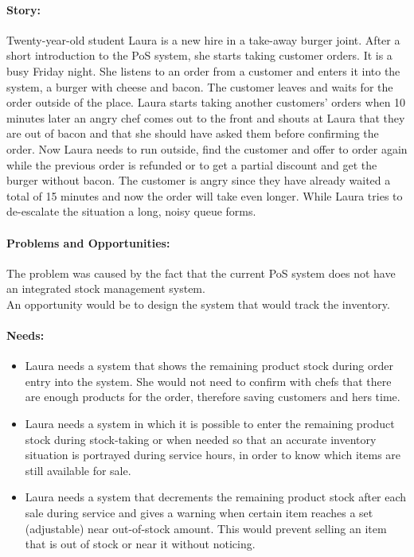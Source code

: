 \documentclass{article}
\begin{document}
\paragraph{\small Story:} Twenty-year-old student Laura is a new hire in a take-away burger joint. After a short introduction to the PoS system, she starts taking customer orders. It is a busy Friday night. She listens to an order from a customer and enters it into the system, a burger with cheese and bacon. The customer leaves and waits for the order outside of the place. Laura starts taking another customers' orders when 10 minutes later an angry chef comes out to the front and shouts at Laura that they are out of bacon and that she should have asked them before confirming the order. Now Laura needs to run outside, find the customer and offer to order again while the previous order is refunded or to get a partial discount and get the burger without bacon. The customer is angry since they have already waited a total of 15 minutes and now the order will take even longer. While Laura tries to de-escalate the situation a long, noisy queue forms.
\paragraph{\small Problems and Opportunities:} The problem was caused by the fact that the current PoS system does not have an integrated stock management system.\\ An opportunity would be to design the system that would track the inventory.

\paragraph{Needs:}
\begin{itemize}
    \item Laura needs a system that shows the remaining product stock during order entry into the system. She would not need to confirm with chefs that there are enough products for the order, therefore saving customers and hers time.
    \item Laura needs a system in which it is possible to enter the remaining product stock during stock-taking or when needed so that an accurate inventory situation is portrayed during service hours, in order to know which items are still available for sale.
    \item Laura needs a system that decrements the remaining product stock after each sale during service and gives a warning when certain item reaches a set (adjustable) near out-of-stock amount. This would prevent selling an item that is out of stock or near it without noticing.
\end{itemize}
\end{document}

